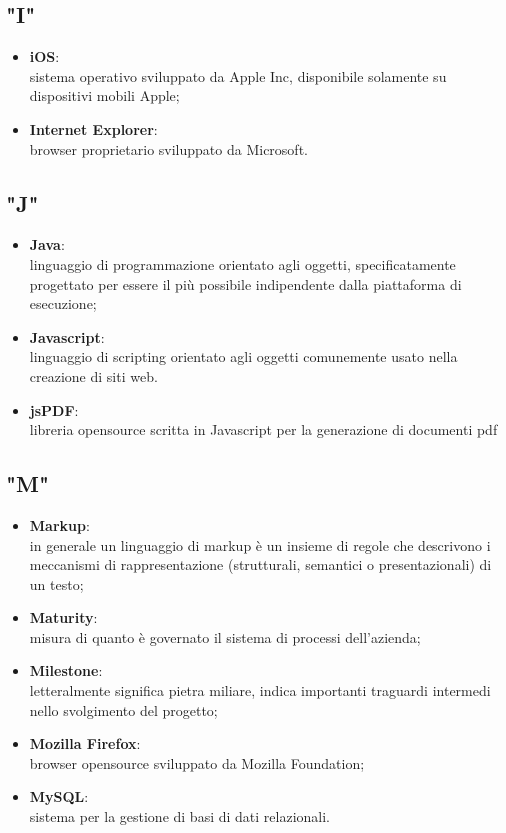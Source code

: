 \subsection*{"I"}
\begin{itemize}
\itemsep2em
\item \textbf{iOS}:\\ sistema operativo sviluppato da Apple Inc, disponibile solamente su dispositivi mobili Apple;
\item \textbf{Internet Explorer}:\\ browser proprietario sviluppato da Microsoft.
\end{itemize}

\subsection*{"J"}
\begin{itemize}
\itemsep2em
\item \textbf{Java}:\\ linguaggio di programmazione orientato agli oggetti, specificatamente progettato per essere il più possibile indipendente dalla piattaforma di esecuzione;
\item \textbf{Javascript}:\\ linguaggio di scripting orientato agli oggetti comunemente usato nella creazione di siti web.
\item \textbf{jsPDF}:\\ libreria opensource scritta in Javascript per la generazione di documenti pdf
\end{itemize}

\subsection*{"M"}
\begin{itemize}
\itemsep2em
\item \textbf{Markup}:\\ in generale un linguaggio di markup è un insieme di regole che descrivono i meccanismi di rappresentazione (strutturali, semantici o presentazionali) di un testo;
\item \textbf{Maturity}:\\ misura di quanto è governato il sistema di processi dell'azienda;
\item \textbf{Milestone}:\\ letteralmente significa pietra miliare, indica importanti traguardi intermedi nello svolgimento del progetto;
\item \textbf{Mozilla Firefox}:\\ browser opensource sviluppato da Mozilla Foundation;
\item \textbf{MySQL}:\\ sistema per la gestione di basi di dati relazionali.
\end{itemize}


